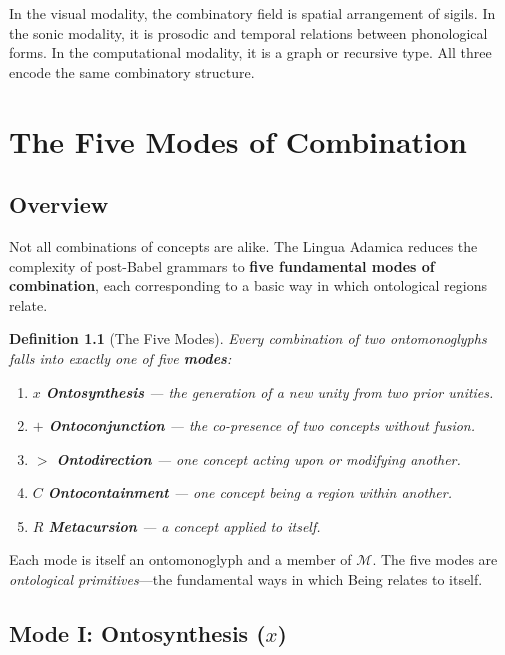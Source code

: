 \documentclass[12pt, letterpaper]{book}
\def\otimes{x}%
\def\oplus{+}%
\def\triangleright{>}%
\def\subset{C}%
\def\circlearrowleft{R}%
\newtheorem{definition}{Definition}[chapter]
\begin{document}
In the visual modality, the combinatory field is spatial arrangement of sigils. In the sonic modality, it is prosodic and temporal relations between phonological forms. In the computational modality, it is a graph or recursive type. All three encode the same combinatory structure.


\chapter{The Five Modes of Combination}
\label{sec:modes}

\section{Overview}

Not all combinations of concepts are alike. The Lingua Adamica reduces the complexity of post-Babel grammars to \textbf{five fundamental modes of combination}, each corresponding to a basic way in which ontological regions relate.

\begin{definition}[The Five Modes]
Every combination of two ontomonoglyphs falls into exactly one of five \textbf{modes}:
\begin{enumerate}[label=(\roman*)]
    \item $\otimes$ \quad \textbf{Ontosynthesis} --- the generation of a new unity from two prior unities.
    \item $\oplus$ \quad \textbf{Ontoconjunction} --- the co-presence of two concepts without fusion.
    \item $\triangleright$ \quad \textbf{Ontodirection} --- one concept acting upon or modifying another.
    \item $\subset$ \quad \textbf{Ontocontainment} --- one concept being a region within another.
    \item $\circlearrowleft$ \quad \textbf{Metacursion} --- a concept applied to itself.
\end{enumerate}
\end{definition}

Each mode is itself an ontomonoglyph and a member of $\mathcal{M}$. The five modes are \textit{ontological primitives}---the fundamental ways in which Being relates to itself.

\section{Mode I: Ontosynthesis ($\otimes$)}
\end{document}
